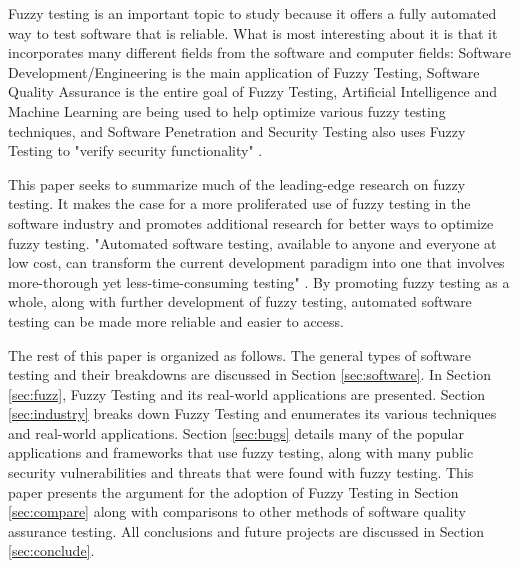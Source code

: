 \documentclass[10pt, final, journal, letterpaper, twoside, twocolumn]{IEEEtran}
\begin{document}
	Fuzzy testing is an important topic to study because it offers a fully automated way to test software that is reliable. What is most interesting about it is that it incorporates many different fields from the software and computer fields: Software Development/Engineering is the main application of Fuzzy Testing, Software Quality Assurance is the entire goal of Fuzzy Testing, Artificial Intelligence and Machine Learning are being used to help optimize various fuzzy testing techniques, and Software Penetration and Security Testing also uses Fuzzy Testing to "verify security functionality" \cite{penetration}.
	
	This paper seeks to summarize much of the leading-edge research on fuzzy testing. It makes the case for a more proliferated use of fuzzy testing in the software industry and promotes additional research for better ways to optimize fuzzy testing. "Automated software testing, available to anyone and everyone at low cost, can transform the current development paradigm into one that involves more-thorough yet less-time-consuming testing" \cite{automation}. By promoting fuzzy testing as a whole, along with further development of fuzzy testing, automated software testing can be made more reliable and easier to access.
	
	The rest of this paper is organized as follows. The general types of software testing and their breakdowns are discussed in Section \ref{sec:software}. In Section \ref{sec:fuzz}, Fuzzy Testing and its real-world applications are presented. Section \ref{sec:industry} breaks down Fuzzy Testing and enumerates its various techniques and real-world applications. Section \ref{sec:bugs} details many of the popular applications and frameworks that use fuzzy testing, along with many public security vulnerabilities and threats that were found with fuzzy testing. This paper presents the argument for the adoption of Fuzzy Testing in Section \ref{sec:compare} along with comparisons to other methods of software quality assurance testing. All conclusions and future projects are discussed in Section \ref{sec:conclude}.

\pagebreak
\end{document}
